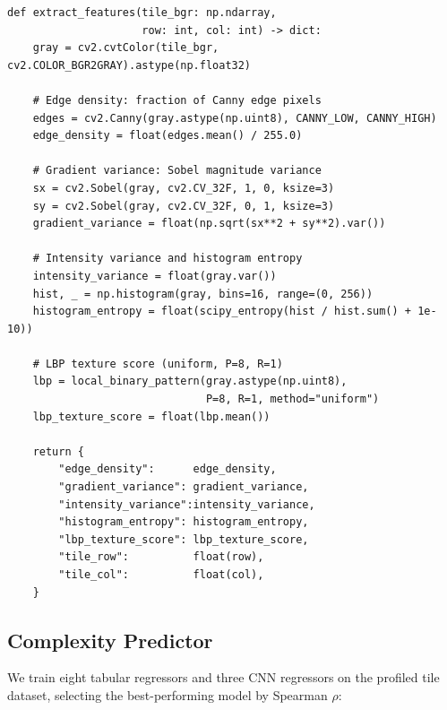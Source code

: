 \documentclass[12pt,a4paper]{article}
\begin{document}
\begin{lstlisting}[caption={Per-tile feature extraction (\texttt{src/features.py}).}, label=lst:features]
def extract_features(tile_bgr: np.ndarray,
                     row: int, col: int) -> dict:
    gray = cv2.cvtColor(tile_bgr, cv2.COLOR_BGR2GRAY).astype(np.float32)

    # Edge density: fraction of Canny edge pixels
    edges = cv2.Canny(gray.astype(np.uint8), CANNY_LOW, CANNY_HIGH)
    edge_density = float(edges.mean() / 255.0)

    # Gradient variance: Sobel magnitude variance
    sx = cv2.Sobel(gray, cv2.CV_32F, 1, 0, ksize=3)
    sy = cv2.Sobel(gray, cv2.CV_32F, 0, 1, ksize=3)
    gradient_variance = float(np.sqrt(sx**2 + sy**2).var())

    # Intensity variance and histogram entropy
    intensity_variance = float(gray.var())
    hist, _ = np.histogram(gray, bins=16, range=(0, 256))
    histogram_entropy = float(scipy_entropy(hist / hist.sum() + 1e-10))

    # LBP texture score (uniform, P=8, R=1)
    lbp = local_binary_pattern(gray.astype(np.uint8),
                               P=8, R=1, method="uniform")
    lbp_texture_score = float(lbp.mean())

    return {
        "edge_density":      edge_density,
        "gradient_variance": gradient_variance,
        "intensity_variance":intensity_variance,
        "histogram_entropy": histogram_entropy,
        "lbp_texture_score": lbp_texture_score,
        "tile_row":          float(row),
        "tile_col":          float(col),
    }
\end{lstlisting}

\subsection{Complexity Predictor}

We train eight tabular regressors and three CNN regressors on the profiled tile dataset, selecting the best-performing model by Spearman $\rho$:
\end{document}
